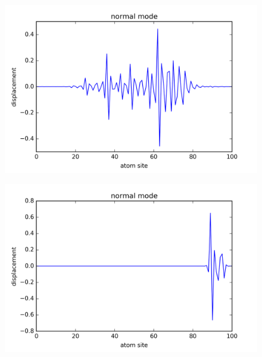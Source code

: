 \begin{figure}[!htbh]
\centering
\begin{minipage}{.45\textwidth}
  \centering
  \includegraphics[width=1.1\linewidth]{Harmonic_spring_ratio/spr_N_103sp_2_0p_0_576th.png}
  \label{fig:spring_N_103m_2.0_p_0_5_76th}
\end{minipage}\qquad
\begin{minipage}{.45\textwidth}
  \centering
  \includegraphics[width=1.1\linewidth]{Harmonic_spring_ratio/spr_N_103sp_5_0p_0_576th.png}
  \label{fig:spring_N_103m_5.0_p_0_5_51st}
\end{minipage}
\end{figure}

